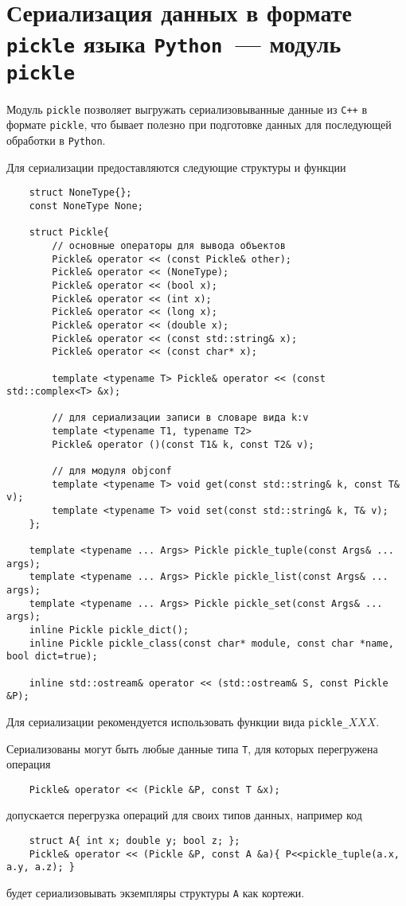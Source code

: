 \section{Сериализация данных в формате {\tt pickle} языка {\tt Python}~--- модуль {\tt pickle}}
Модуль \verb'pickle' позволяет выгружать сериализовыванные данные из \verb'C++' в формате \verb'pickle',
что бывает полезно при подготовке данных  для последующей обработки в \verb'Python'.

Для сериализации предоставляются следующие структуры и функции
\begin{verbatim}
    struct NoneType{};
    const NoneType None;

    struct Pickle{
        // основные операторы для вывода объектов
        Pickle& operator << (const Pickle& other);
        Pickle& operator << (NoneType);
        Pickle& operator << (bool x);
        Pickle& operator << (int x);
        Pickle& operator << (long x);
        Pickle& operator << (double x);
        Pickle& operator << (const std::string& x); 		
        Pickle& operator << (const char* x);

        template <typename T> Pickle& operator << (const std::complex<T> &x);
		
        // для сериализации записи в словаре вида k:v
        template <typename T1, typename T2> 
        Pickle& operator ()(const T1& k, const T2& v);

        // для модуля objconf 
        template <typename T> void get(const std::string& k, const T& v);
        template <typename T> void set(const std::string& k, T& v);
    };

    template <typename ... Args> Pickle pickle_tuple(const Args& ... args);
    template <typename ... Args> Pickle pickle_list(const Args& ... args);
    template <typename ... Args> Pickle pickle_set(const Args& ... args);
    inline Pickle pickle_dict();
    inline Pickle pickle_class(const char* module, const char *name, bool dict=true);
    
    inline std::ostream& operator << (std::ostream& S, const Pickle &P);
\end{verbatim}
Для сериализации рекомендуется использовать функции вида \verb'pickle_'$XXX$.

Сериализованы могут быть любые данные типа \verb'T', для которых перегружена операция
\begin{verbatim}
    Pickle& operator << (Pickle &P, const T &x);
\end{verbatim}
допускается перегрузка операций для своих типов данных, например код
\begin{verbatim}
    struct A{ int x; double y; bool z; };
    Pickle& operator << (Pickle &P, const A &a){ P<<pickle_tuple(a.x, a.y, a.z); }
\end{verbatim}
будет сериализовывать экземпляры структуры \verb'A' как кортежи. 

